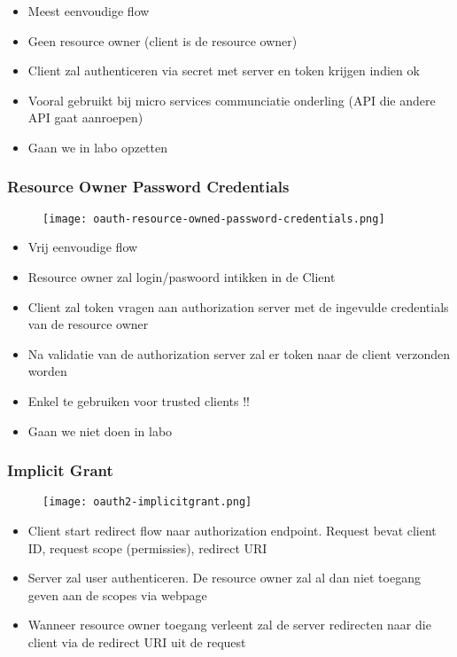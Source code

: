 \documentclass{article}
\begin{document}
\begin{itemize}
    \item Meest eenvoudige flow
    \item Geen resource owner (client is de resource owner)
    \item Client zal authenticeren via secret met server en token krijgen indien ok
    \item Vooral gebruikt bij micro services communciatie onderling (API die andere API gaat aanroepen)
    \item Gaan we in labo opzetten
\end{itemize}


\subsubsection{Resource Owner Password Credentials}

\begin{figure}[H]
    \centering
    \texttt{[image: oauth-resource-owned-password-credentials.png]}
\end{figure}

\begin{itemize}
    \item Vrij eenvoudige flow
    \item Resource owner zal login/paswoord intikken in de Client
    \item Client zal token vragen aan authorization server met de ingevulde credentials van de resource owner
    \item Na validatie van de authorization server zal er token naar de client verzonden worden
    \item Enkel te gebruiken voor trusted clients !!
    \item Gaan we niet doen in labo
\end{itemize}

\subsubsection{Implicit Grant}

\begin{figure}[H]
    \centering
    \texttt{[image: oauth2-implicitgrant.png]}
\end{figure}

\begin{itemize}
    \item Client start redirect flow naar authorization endpoint. Request bevat client ID, request scope (permissies), redirect URI
    \item Server zal user authenticeren. De resource owner zal al dan niet toegang geven aan de scopes via webpage
    \item Wanneer resource owner toegang verleent zal de server redirecten naar die client via de redirect URI uit de request
\end{itemize}
\end{document}
